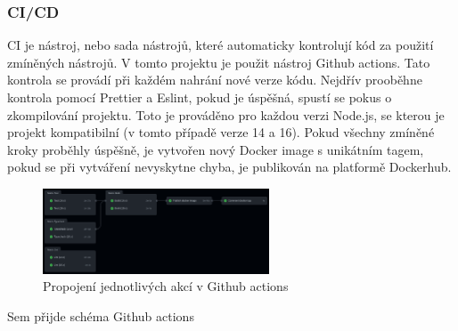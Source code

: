\subsubsection{CI/CD}
CI je nástroj, nebo sada nástrojů, které automaticky kontrolují kód za použití zmíněných nástrojů.
V tomto projektu je použit nástroj Github actions. Tato kontrola se provádí 
při každém nahrání nové verze kódu. Nejdřív prooběhne kontrola pomocí Prettier a Eslint, pokud je úspěšná,
spustí se pokus o zkompilování projektu. Toto je prováděno pro každou verzi Node.js, se kterou
je projekt kompatibilní (v tomto případě verze 14 a 16). Pokud všechny zmíněné kroky proběhly úspěšně,
je vytvořen nový Docker image s unikátním tagem, pokud se při vytváření nevyskytne chyba, je publikován 
na platformě Dockerhub.
\begin{figure}[h]
    \centering
    \includegraphics[width=0.6\textwidth]{images/github-actions-diagram.png}
    \caption{Propojení jednotlivých akcí v Github actions}

\end{figure}
Sem přijde schéma Github actions